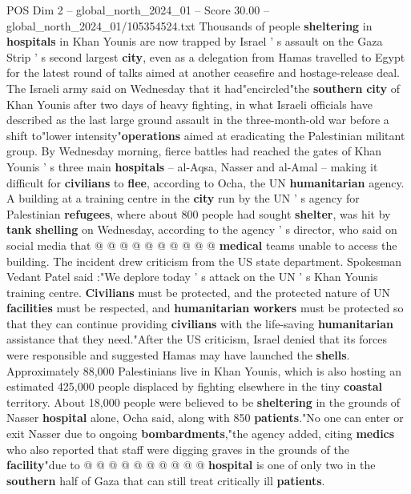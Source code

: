 \begin{textsample}{POS Dim 2 – global\_north\_2024\_01 – Score 30.00 – global\_north\_2024\_01/105354524.txt}  \label{ex:f2_pos_208}
Thousands of people \textbf{sheltering} in \textbf{hospitals} in Khan Younis are now trapped by Israel ' s assault on the Gaza Strip ' s second largest \textbf{city}, even as a delegation from Hamas travelled to Egypt for the latest round of talks aimed at another ceasefire and hostage-release deal.
The Israeli army said on Wednesday that it had"encircled"the \textbf{southern} \textbf{city} of Khan Younis after two days of heavy fighting, in what Israeli officials have described as the last large ground assault in the three-month-old war before a shift to"lower intensity"\textbf{operations} aimed at eradicating the Palestinian militant group.
By Wednesday morning, fierce battles had reached the gates of Khan Younis ' s three main \textbf{hospitals} -- al-Aqsa, Nasser and al-Amal -- making it difficult for \textbf{civilians} to \textbf{flee}, according to Ocha, the UN \textbf{humanitarian} agency.
A building at a training centre in the \textbf{city} run by the UN ' s agency for Palestinian \textbf{refugees}, where about 800 people had sought \textbf{shelter}, was hit by \textbf{tank} \textbf{shelling} on Wednesday, according to the agency ' s director, who said on social media that @ @ @ @ @ @ @ @ @ @ \textbf{medical} teams unable to access the building.
The incident drew criticism from the US state department.
Spokesman Vedant Patel said :"We deplore today ' s attack on the UN ' s Khan Younis training centre. \textbf{Civilians} must be protected, and the protected nature of UN \textbf{facilities} must be respected, and \textbf{humanitarian} \textbf{workers} must be protected so that they can continue providing \textbf{civilians} with the life-saving \textbf{humanitarian} assistance that they need."After the US criticism, Israel denied that its forces were responsible and suggested Hamas may have launched the \textbf{shells}.
Approximately 88,000 Palestinians live in Khan Younis, which is also hosting an estimated 425,000 people displaced by fighting elsewhere in the tiny \textbf{coastal} territory.
About 18,000 people were believed to be \textbf{sheltering} in the grounds of Nasser \textbf{hospital} alone, Ocha said, along with 850 \textbf{patients}."No one can enter or exit Nasser due to ongoing \textbf{bombardments},"the agency added, citing \textbf{medics} who also reported that staff were digging graves in the grounds of the \textbf{facility}"due to @ @ @ @ @ @ @ @ @ @ \textbf{hospital} is one of only two in the \textbf{southern} half of Gaza that can still treat critically ill \textbf{patients}.

\end{textsample}
